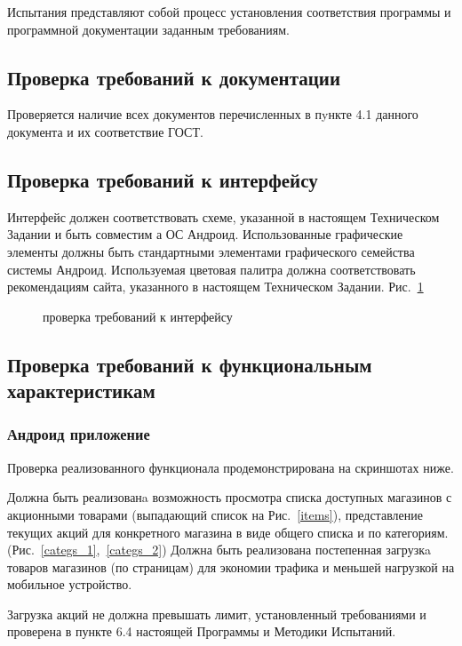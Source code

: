 Испытания представляют собой процесс установления соответствия программы и
программной документации заданным требованиям.

\subsection{Проверка требований к документации}
Проверяется наличие всех документов перечисленных в пyнкте 4.1 данного
документа и их соответствие ГОСТ.

\subsection{Проверка требований к интерфейсу}
Интерфейс должен соответствовать схеме, указанной в настоящем Техническом
Задании и быть совместим а ОС Андроид. Использованные графические элементы
должны быть стандартными элементами графического семейства системы Андроид.
Используемая цветовая палитра должна соответствовать рекомендациям сайта,
указанного в настоящем Техническом Задании. Рис.~\ref{interface}

\begin{figure}[h!]
    \centering
    \caption{проверка требований к интерфейсу}
    \label{interface}
\end{figure}

\newpage
\subsection{Проверка требований к функциональным характеристикам}

\subsubsection{Андроид приложение}
Проверка реализованного функционала продемонстрирована на скриншотах ниже.

Должна быть реализованa возможность просмотра списка доступных магазинов с
акционными товарами (выпадающий список на Рис.~\ref{items}), представление текущих акций для конкретного магазина в
виде общего списка и по категориям. (Рис.~\ref{categs_1},~\ref{categs_2}) Должна быть реализована постепенная
загрузкa товаров магазинов (по страницам) для экономии трафика и меньшей
нагрузкой на мобильное устройство.

Загрузка акций не должна превышать лимит, установленный требованиями и проверена в
пункте 6.4 настоящей Программы и Методики Испытаний.

